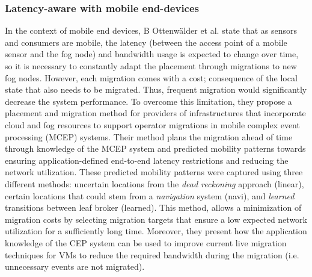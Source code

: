 \subsubsection{Latency-aware with mobile end-devices}
\noindent\tab In the context of mobile end devices, B Ottenwälder et al. \cite{ottenwalder2013migcep} state that as sensors and consumers are mobile, the latency (between the access point of a mobile sensor and the fog node) and bandwidth usage is expected to change over time, so it is necessary to constantly adapt the placement through migrations to new fog nodes. However, each migration comes with a cost; consequence of the local state that also needs to be migrated. Thus, frequent migration would significantly decrease the system performance. To overcome this limitation, they propose a placement and migration method for providers of infrastructures that incorporate cloud and fog resources to support operator migrations in mobile complex event processing (MCEP) systems. Their method plans the migration ahead of time through knowledge of the MCEP system and predicted mobility patterns towards ensuring application-defined end-to-end latency restrictions and reducing the network utilization. These predicted mobility patterns were captured using three different methods: uncertain locations from the \textit{dead reckoning} approach (linear), certain locations that could stem from a \textit{navigation} system (navi), and \textit{learned} transitions between leaf broker (learned). This method, allows a minimization of migration costs by selecting migration targets that ensure a low expected network utilization for a sufficiently long time. Moreover, they present how the application knowledge of the CEP system can be used to improve current live migration techniques for VMs to reduce the required bandwidth during the migration (i.e. unnecessary events are not migrated).\\
